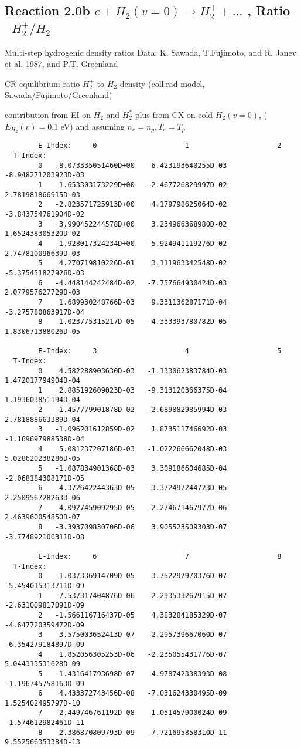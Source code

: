 \documentclass[12pt,dvipdfmx]{article}
\begin{document}
\newpage
\subsection{
Reaction 2.0b $e + H_2(v=0) \rightarrow H_2^+ + ... $ , Ratio  \ $H_2^+/H_2$
}

 Multi-step hydrogenic density ratios
 Data: K. Sawada, T.Fujimoto, \cite{kn:Sawada} and R. Janev et al, 1987, and P.T. Greenland


  CR equilibrium ratio $H_2^+$ to $H_2$ density
  (coll.rad model, Sawada/Fujimoto/Greenland)

  contribution from  EI on $H_2$ and $H_2^*$  plus from CX on cold $H_2(v=0)$,
($E_{H_2}(v)=0.1$ eV) and assuming $n_e=n_p, T_e=T_p$


\begin{small}\begin{verbatim}
        E-Index:     0                     1                     2
  T-Index:
        0   -8.073335051460D+00    6.423193640255D-03   -8.948271203923D-03
        1    1.653303173229D+00   -2.467726829997D-02    2.781981866915D-03
        2   -2.823571725913D+00    4.179798625064D-02   -3.843754761904D-02
        3    3.990452244578D+00    3.234966368980D-02    1.652438305320D-02
        4   -1.928017324234D+00   -5.924941119276D-02    2.747810096639D-03
        5    4.270719810226D-01    3.111963342548D-02   -5.375451827926D-03
        6   -4.448144242484D-02   -7.757664930424D-03    2.077957627729D-03
        7    1.689930248766D-03    9.331136287171D-04   -3.275780863917D-04
        8    1.023775315217D-05   -4.333393780782D-05    1.830671388026D-05

        E-Index:     3                     4                     5
  T-Index:
        0    4.582288903630D-03   -1.133062383784D-03    1.472017794904D-04
        1    2.885192609023D-03   -9.313120366375D-04    1.193603851194D-04
        2    1.457779901878D-02   -2.689882985994D-03    2.781888663389D-04
        3   -1.096201612859D-02    1.873511746692D-03   -1.169697988538D-04
        4    5.081237207186D-03   -1.022266662048D-03    5.028620238286D-05
        5   -1.087834901368D-03    3.309186604685D-04   -2.068184308171D-05
        6   -4.372642244363D-05   -3.372497244723D-05    2.250956728263D-06
        7    4.092745909295D-05   -2.274671467977D-06    2.463960054850D-07
        8   -3.393709830706D-06    3.905523509303D-07   -3.774892100311D-08

        E-Index:     6                     7                     8
  T-Index:
        0   -1.037336914709D-05    3.752297970376D-07   -5.454015313711D-09
        1   -7.537317404876D-06    2.293533267915D-07   -2.631009817091D-09
        2   -1.566116716437D-05    4.383284185329D-07   -4.647720359472D-09
        3    3.575003652413D-07    2.295739667060D-07   -6.354279184897D-09
        4    1.852056305253D-06   -2.235055431776D-07    5.044313531628D-09
        5   -1.431641793698D-07    4.978742338393D-08   -1.196745758163D-09
        6    4.433372743456D-08   -7.031624330495D-09    1.525402495797D-10
        7   -2.449746761192D-08    1.051457900024D-09   -1.574612982461D-11
        8    2.386870809793D-09   -7.721695858310D-11    9.552566353384D-13


\end{verbatim}
\end{small}
\end{document}
